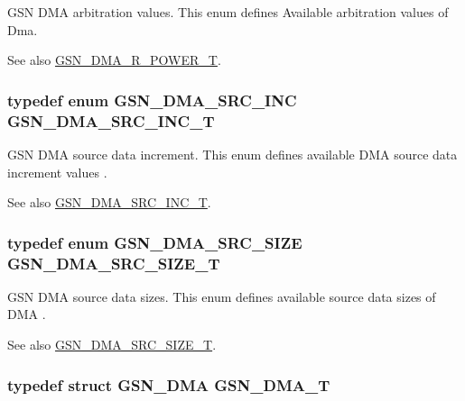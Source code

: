 GSN DMA arbitration values. This enum defines Available arbitration values of Dma. 

\begin{DoxySeeAlso}{See also}
\hyperlink{a00645_gadf8a8e2066de9043a495c7764612c35f}{GSN\_\-DMA\_\-R\_\-POWER\_\-T}. 
\end{DoxySeeAlso}
\hypertarget{a00645_gadfad5571e188cca605e051802c24ada0}{
\subsubsection[{GSN\_\-DMA\_\-SRC\_\-INC\_\-T}]{\setlength{\rightskip}{0pt plus 5cm}typedef enum {\bf GSN\_\-DMA\_\-SRC\_\-INC}  {\bf GSN\_\-DMA\_\-SRC\_\-INC\_\-T}}}
\label{a00645_gadfad5571e188cca605e051802c24ada0}


GSN DMA source data increment. This enum defines available DMA source data increment values . 

\begin{DoxySeeAlso}{See also}
\hyperlink{a00645_gadfad5571e188cca605e051802c24ada0}{GSN\_\-DMA\_\-SRC\_\-INC\_\-T}. 
\end{DoxySeeAlso}
\hypertarget{a00645_ga30dffcfe8e6fc270f93048d90cd440ec}{
\subsubsection[{GSN\_\-DMA\_\-SRC\_\-SIZE\_\-T}]{\setlength{\rightskip}{0pt plus 5cm}typedef enum {\bf GSN\_\-DMA\_\-SRC\_\-SIZE}  {\bf GSN\_\-DMA\_\-SRC\_\-SIZE\_\-T}}}
\label{a00645_ga30dffcfe8e6fc270f93048d90cd440ec}


GSN DMA source data sizes. This enum defines available source data sizes of DMA . 

\begin{DoxySeeAlso}{See also}
\hyperlink{a00645_ga30dffcfe8e6fc270f93048d90cd440ec}{GSN\_\-DMA\_\-SRC\_\-SIZE\_\-T}. 
\end{DoxySeeAlso}
\hypertarget{a00645_ga61edafecbc46e3ba81ec48b9cf3aa1fa}{
\subsubsection[{GSN\_\-DMA\_\-T}]{\setlength{\rightskip}{0pt plus 5cm}typedef struct {\bf GSN\_\-DMA} {\bf GSN\_\-DMA\_\-T}}}
\label{a00645_ga61edafecbc46e3ba81ec48b9cf3aa1fa}


